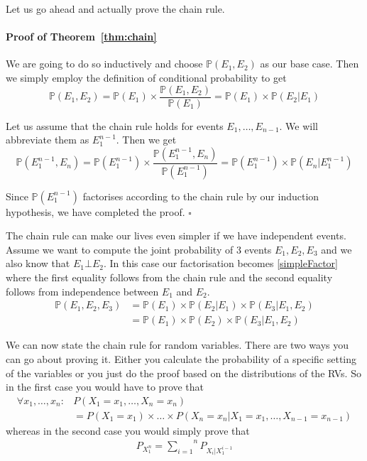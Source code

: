 Let us go ahead and actually prove the chain rule. 
\paragraph{Proof of Theorem~\ref{thm:chain}} We are going to do so inductively and choose $ \mathbb{P}(E_{1}, E_{2}) $ as our
base case. Then we simply employ the definition of conditional probability to get
\begin{equation}
\mathbb{P}(E_{1}, E_{2}) = \mathbb{P}(E_{1}) \times \dfrac{\mathbb{P}(E_{1}, E_{2})}{\mathbb{P}(E_{1})} = \mathbb{P}(E_{1}) \times \mathbb{P}(E_{2}|E_{1})
\end{equation}

Let us assume that the chain rule holds for events $ E_{1}, \ldots, E_{n-1} $. We will abbreviate them as $ E_{1}^{n-1} $. Then we get
\begin{equation}
\mathbb{P}(E_{1}^{n-1}, E_{n}) = \mathbb{P}(E_{1}^{n-1}) \times \dfrac{\mathbb{P}(E_{1}^{n-1}, E_{n})}{\mathbb{P}(E_{1}^{n-1})} 
= \mathbb{P}(E_{1}^{n-1}) \times \mathbb{P}(E_{n}|E_{1}^{n-1})
\end{equation}

Since $ \mathbb{P}(E_{1}^{n-1}) $ factorises according to the chain
rule by our induction hypothesis, we have completed the proof.
$ \square $\bigskip

The chain rule can make our lives even simpler if we have independent events. Assume we want to compute the joint probability of 3 events 
$ E_{1},E_{2},E_{3} $ and we also know that $ E_{1} \bot E_{2} $. In this case our factorisation becomes \eqref{simpleFactor} where
the first equality follows from the chain rule and the second equality follows from independence between $ E_{1} $ and $ E_{2} $.
\begin{align} \label{simpleFactor}
\mathbb{P}(E_{1}, E_{2}, E_{3}) &= \mathbb{P}(E_{1}) \times \mathbb{P}(E_{2}|E_{1}) \times \mathbb{P}(E_{3}|E_{1},E_{2}) \\
&= \mathbb{P}(E_{1}) \times \mathbb{P}(E_{2}) \times \mathbb{P}(E_{3}|E_{1},E_{2}) \nonumber
\end{align}

We can now state the chain rule for random variables. There are two ways you can go about proving it. Either you 
calculate the probability of a specific setting of the variables or you just do the proof based on the distributions of the RVs.
So in the first case you would have to prove that
\begin{align*}
\forall x_1,\ldots,x_n: &P(X_{1} = x_{1}, \ldots, X_{n} = x_{n}) \\
&= P(X_{1} = x_{1}) \times \ldots \times P(X_{n} = x_{n}|X_{1}=x_{1}, \ldots, X_{n-1} = x_{n-1})
\end{align*}
whereas in the second case you would simply prove that
\begin{align*}
P_{X_{1}^{n}} = \overset{n}{\underset{i=1}{\sum}}P_{X_{i}|X_{1}^{i-1}}
\end{align*}

